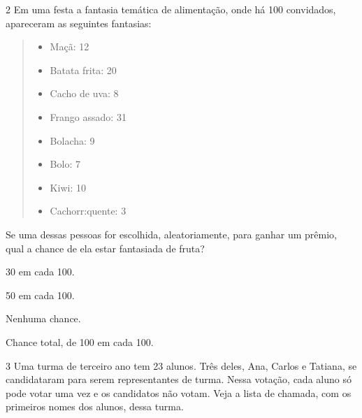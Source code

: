 \num{2} Em uma festa a fantasia temática de alimentação, onde há 100 convidados, apareceram as seguintes fantasias:

\begin{quote}
\begin{itemize}
\item Maçã: 12
\item Batata frita: 20
\item Cacho de uva: 8
\item Frango assado: 31
\item Bolacha: 9
\item Bolo: 7
\item Kiwi: 10
\item Cachorr:quente: 3
\end{itemize}
\end{quote}

Se uma dessas pessoas for escolhida, aleatoriamente, para ganhar um prêmio, qual a chance de ela estar fantasiada de fruta?

\begin{escolha}
\item
30 em cada 100.
\item
50 em cada 100.
\item
Nenhuma chance.
\item
Chance total, de 100 em cada 100.
\end{escolha}


\num{3} Uma turma de terceiro ano tem 23 alunos. Três deles, Ana, Carlos e Tatiana, se candidataram para serem representantes de turma. Nessa votação, cada aluno só pode votar uma vez e os candidatos não votam. Veja a lista de chamada, com os primeiros nomes dos alunos, dessa turma.

